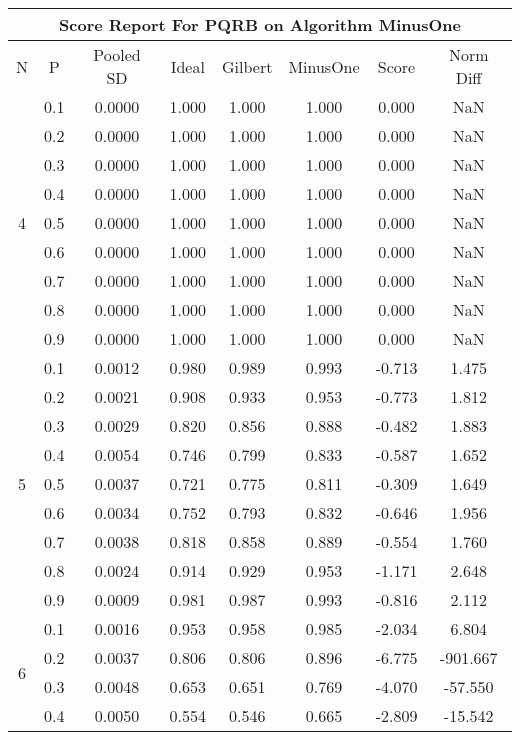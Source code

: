 \documentclass[11pt,a4paper]{report}
\begin{document}
\begin{longtable}{ | c | c || c | c | c | c | c | c | }
\hline
\multicolumn{8}{|c|}{ Score Report For PQRB on Algorithm MinusOne} \\
\hline
N & P & Pooled SD &  Ideal &  Gilbert & MinusOne  & Score & Norm Diff \\
 \hline
 \hline
 \endhead
\multirow{9}{*}{4} & 0.1 & 0.0000 & 1.000 & 1.000 & 1.000 & 0.000 & NaN \\
 & 0.2 & 0.0000 & 1.000 & 1.000 & 1.000 & 0.000 & NaN \\
 & 0.3 & 0.0000 & 1.000 & 1.000 & 1.000 & 0.000 & NaN \\
 & 0.4 & 0.0000 & 1.000 & 1.000 & 1.000 & 0.000 & NaN \\
 & 0.5 & 0.0000 & 1.000 & 1.000 & 1.000 & 0.000 & NaN \\
 & 0.6 & 0.0000 & 1.000 & 1.000 & 1.000 & 0.000 & NaN \\
 & 0.7 & 0.0000 & 1.000 & 1.000 & 1.000 & 0.000 & NaN \\
 & 0.8 & 0.0000 & 1.000 & 1.000 & 1.000 & 0.000 & NaN \\
 & 0.9 & 0.0000 & 1.000 & 1.000 & 1.000 & 0.000 & NaN \\
 \hline
\multirow{9}{*}{5} & 0.1 & 0.0012 & 0.980 & 0.989 & 0.993 & -0.713 & 1.475 \\
 & 0.2 & 0.0021 & 0.908 & 0.933 & 0.953 & -0.773 & 1.812 \\
 & 0.3 & 0.0029 & 0.820 & 0.856 & 0.888 & -0.482 & 1.883 \\
 & 0.4 & 0.0054 & 0.746 & 0.799 & 0.833 & -0.587 & 1.652 \\
 & 0.5 & 0.0037 & 0.721 & 0.775 & 0.811 & -0.309 & 1.649 \\
 & 0.6 & 0.0034 & 0.752 & 0.793 & 0.832 & -0.646 & 1.956 \\
 & 0.7 & 0.0038 & 0.818 & 0.858 & 0.889 & -0.554 & 1.760 \\
 & 0.8 & 0.0024 & 0.914 & 0.929 & 0.953 & -1.171 & 2.648 \\
 & 0.9 & 0.0009 & 0.981 & 0.987 & 0.993 & -0.816 & 2.112 \\
 \hline
\multirow{9}{*}{6} & 0.1 & 0.0016 & 0.953 & 0.958 & 0.985 & -2.034 & 6.804 \\
 & 0.2 & 0.0037 & 0.806 & 0.806 & 0.896 & -6.775 & -901.667 \\
 & 0.3 & 0.0048 & 0.653 & 0.651 & 0.769 & -4.070 & -57.550 \\
 & 0.4 & 0.0050 & 0.554 & 0.546 & 0.665 & -2.809 & -15.542 \\

\end{longtable}
\end{document}
